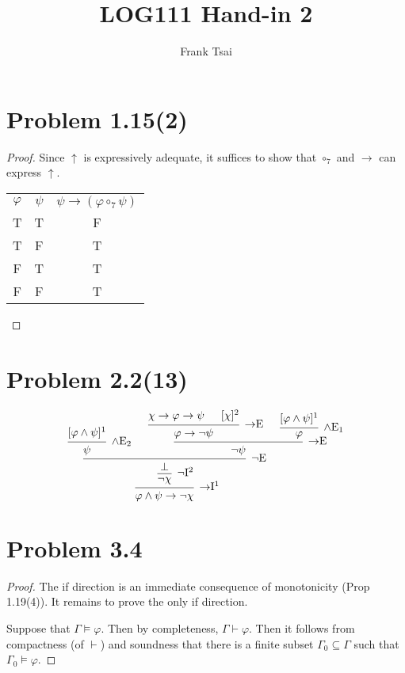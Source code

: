\documentclass[a4paper]{article}
\title{LOG111 Hand-in 2}
\author{Frank Tsai}
\begin{document}
\maketitle

\section{Problem 1.15(2)}
\begin{proof}
  Since $\uparrow$ is expressively adequate, it suffices to show that $\circ_{7}$ and $\to$ can express $\uparrow$.
  \begin{center}
    \begin{tabular}[h]{cc|c}
      $\varphi$ & $\psi$ & $\psi \to (\varphi \circ_{7} \psi)$\\
      T & T & F\\
      T & F & T\\
      F & T & T\\
      F & F & T\\
    \end{tabular}
  \end{center}
\end{proof}

\section{Problem 2.2(13)}
\[
  \begin{prooftree}
    \hypo{[\varphi \wedge \psi]^{1}}
    \infer1[$\wedge$E$_{2}$]{\psi}
    \hypo{\chi \to \varphi \to \psi}
    \hypo{[\chi]^{2}}
    \infer2[$\to$E]{\varphi \to \lnot \psi}
    \hypo{[\varphi \wedge \psi]^{1}}
    \infer1[$\wedge$E$_{1}$]{\varphi}
    \infer2[$\to$E]{\lnot \psi}
    \infer2[$\lnot$E]{\bot}
    \infer1[$\lnot$I$^{2}$]{\lnot \chi}
    \infer1[$\to$I$^{1}$]{\varphi \wedge \psi \to \lnot \chi}
  \end{prooftree}
\]

\section{Problem 3.4}
\begin{proof}
  The if direction is an immediate consequence of monotonicity (Prop 1.19(4)).
  It remains to prove the only if direction.
  
  Suppose that $\Gamma \models \varphi$.
  Then by completeness, $\Gamma \vdash \varphi$.
  Then it follows from compactness (of $\vdash$) and soundness that there is a finite subset $\Gamma_{0} \subseteq \Gamma$ such that $\Gamma_{0} \models \varphi$.
\end{proof}
\end{document}
